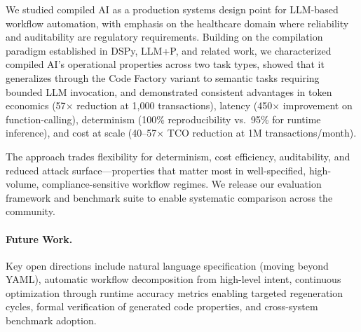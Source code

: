 \documentclass[11pt]{article}
\begin{document}
We studied compiled AI as a production systems design point for LLM-based workflow automation, with emphasis on the healthcare domain where reliability and auditability are regulatory requirements. Building on the compilation paradigm established in DSPy, LLM+P, and related work, we characterized compiled AI's operational properties across two task types, showed that it generalizes through the Code Factory variant to semantic tasks requiring bounded LLM invocation, and demonstrated consistent advantages in token economics (57$\times$ reduction at 1,000 transactions), latency (450$\times$ improvement on function-calling), determinism (100\% reproducibility vs.\ 95\% for runtime inference), and cost at scale (40--57$\times$ TCO reduction at 1M transactions/month).

The approach trades flexibility for determinism, cost efficiency, auditability, and reduced attack surface---properties that matter most in well-specified, high-volume, compliance-sensitive workflow regimes. We release our evaluation framework and benchmark suite to enable systematic comparison across the community.

\paragraph{Future Work.} Key open directions include natural language specification (moving beyond YAML), automatic workflow decomposition from high-level intent, continuous optimization through runtime accuracy metrics enabling targeted regeneration cycles, formal verification of generated code properties, and cross-system benchmark adoption.


\end{document}
